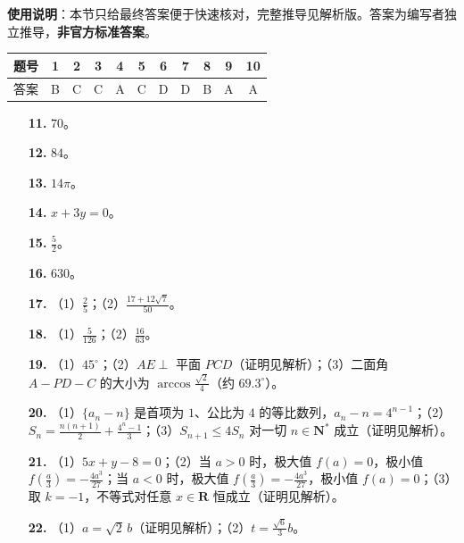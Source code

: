 
\begin{gknotice}
\textbf{使用说明}：本节只给最终答案便于快速核对，完整推导见解析版。答案为编写者独立推导，\textbf{非官方标准答案}。
\end{gknotice}

\begin{center}\begin{tabular}{ccccccccccc}
\toprule
题号 & 1 & 2 & 3 & 4 & 5 & 6 & 7 & 8 & 9 & 10 \\
\midrule
答案 & B & C & C & A & C & D & D & B & A & A \\
\bottomrule
\end{tabular}\end{center}

\begin{itemize}[leftmargin=2.6em]
  \item[\textbf{11.}] $70$。
  \item[\textbf{12.}] $84$。
  \item[\textbf{13.}] $14\pi$。
  \item[\textbf{14.}] $x+3y=0$。
  \item[\textbf{15.}] $\frac52$。
  \item[\textbf{16.}] $630$。
\end{itemize}

\begin{itemize}[leftmargin=2.6em]
  \item[\textbf{17.}] （1）$\frac25$；（2）$\frac{17+12\sqrt7}{50}$。
  \item[\textbf{18.}] （1）$\frac5{126}$；（2）$\frac{16}{63}$。
  \item[\textbf{19.}] （1）$45^\circ$；（2）$AE\perp$ 平面 $PCD$（证明见解析）；（3）二面角 $A-PD-C$ 的大小为 $\arccos\frac{\sqrt2}{4}$（约 $69.3^\circ$）。
  \item[\textbf{20.}] （1）$\{a_n-n\}$ 是首项为 $1$、公比为 $4$ 的等比数列，$a_n-n=4^{n-1}$；（2）$S_n=\frac{n(n+1)}2+\frac{4^n-1}3$；（3）$S_{n+1}\leqslant4S_n$ 对一切 $n\in\mathbf N^*$ 成立（证明见解析）。
  \item[\textbf{21.}] （1）$5x+y-8=0$；（2）当 $a>0$ 时，极大值 $f(a)=0$，极小值 $f\left(\frac a3\right)=-\frac{4a^3}{27}$；当 $a<0$ 时，极大值 $f\left(\frac a3\right)=-\frac{4a^3}{27}$，极小值 $f(a)=0$；（3）取 $k=-1$，不等式对任意 $x\in\mathbf R$ 恒成立（证明见解析）。
  \item[\textbf{22.}] （1）$a=\sqrt2\,b$（证明见解析）；（2）$t=\frac{\sqrt6}{3}b$。
\end{itemize}
